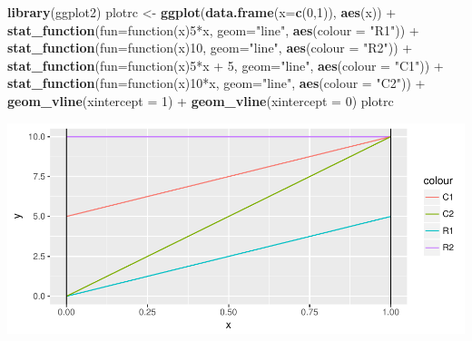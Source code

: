 \documentclass[]{article}
\newenvironment{Shaded}{\begin{snugshade}}{\end{snugshade}}
\newcommand{\KeywordTok}[1]{\textcolor[rgb]{0.13,0.29,0.53}{\textbf{{#1}}}}
\newcommand{\DataTypeTok}[1]{\textcolor[rgb]{0.13,0.29,0.53}{{#1}}}
\newcommand{\DecValTok}[1]{\textcolor[rgb]{0.00,0.00,0.81}{{#1}}}
\newcommand{\StringTok}[1]{\textcolor[rgb]{0.31,0.60,0.02}{{#1}}}
\newcommand{\NormalTok}[1]{{#1}}
\begin{document}
\begin{Shaded}
\begin{Highlighting}[]
\KeywordTok{library}\NormalTok{(ggplot2)}
\NormalTok{plotrc <-}\StringTok{ }\KeywordTok{ggplot}\NormalTok{(}\KeywordTok{data.frame}\NormalTok{(}\DataTypeTok{x=}\KeywordTok{c}\NormalTok{(}\DecValTok{0}\NormalTok{,}\DecValTok{1}\NormalTok{)), }\KeywordTok{aes}\NormalTok{(x)) +}
\StringTok{          }\KeywordTok{stat_function}\NormalTok{(}\DataTypeTok{fun=}\NormalTok{function(x)}\DecValTok{5}\NormalTok{*x, }\DataTypeTok{geom=}\StringTok{"line"}\NormalTok{, }\KeywordTok{aes}\NormalTok{(}\DataTypeTok{colour =} \StringTok{"R1"}\NormalTok{)) +}
\StringTok{          }\KeywordTok{stat_function}\NormalTok{(}\DataTypeTok{fun=}\NormalTok{function(x)}\DecValTok{10}\NormalTok{, }\DataTypeTok{geom=}\StringTok{"line"}\NormalTok{, }\KeywordTok{aes}\NormalTok{(}\DataTypeTok{colour =} \StringTok{"R2"}\NormalTok{)) +}
\StringTok{          }\KeywordTok{stat_function}\NormalTok{(}\DataTypeTok{fun=}\NormalTok{function(x)}\DecValTok{5}\NormalTok{*x +}\StringTok{ }\DecValTok{5}\NormalTok{, }\DataTypeTok{geom=}\StringTok{"line"}\NormalTok{, }\KeywordTok{aes}\NormalTok{(}\DataTypeTok{colour =} \StringTok{"C1"}\NormalTok{)) +}
\StringTok{          }\KeywordTok{stat_function}\NormalTok{(}\DataTypeTok{fun=}\NormalTok{function(x)}\DecValTok{10}\NormalTok{*x, }\DataTypeTok{geom=}\StringTok{"line"}\NormalTok{, }\KeywordTok{aes}\NormalTok{(}\DataTypeTok{colour =} \StringTok{"C2"}\NormalTok{)) +}
\StringTok{          }\KeywordTok{geom_vline}\NormalTok{(}\DataTypeTok{xintercept =} \DecValTok{1}\NormalTok{) +}\StringTok{ }
\StringTok{          }\KeywordTok{geom_vline}\NormalTok{(}\DataTypeTok{xintercept =} \DecValTok{0}\NormalTok{)}
\NormalTok{plotrc}
\end{Highlighting}
\end{Shaded}

\includegraphics{Christophe_Hunt_hw9_files/figure-latex/unnamed-chunk-7-1.pdf}
\end{document}
